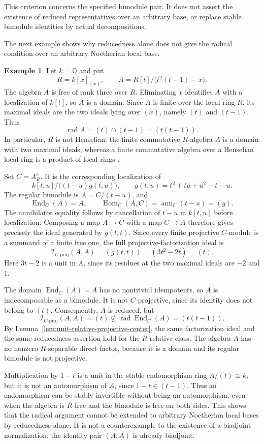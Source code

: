 \documentclass[12pt,a4paper,english,reqno]{amsart}
\numberwithin{equation}{section}
\theoremstyle{plain}
\theoremstyle{definition}
\newtheorem{example}[theorem]{Example}
\begin{document}
This criterion concerns the specified bimodule pair.  It does not
assert the existence of reduced representatives over an arbitrary
base, or replace stable bimodule identities by actual decompositions.

The next example shows why reducedness alone does not give the
radical condition over an arbitrary Noetherian local base.

\begin{example}
\label{ex:nonhenselian-stable-unit}
Let $k=\mathbb Q$ and put
\[
 R=k[x]_{(x)},\qquad
 A=R[t]/\bigl(t^2(t-1)-x\bigr).
\]
The algebra $A$ is free of rank three over $R$.  Eliminating $x$
identifies $A$ with a localization of $k[t]$, so $A$ is a domain.
Since $A$ is finite over the local ring $R$, its maximal ideals are
the two ideals lying over $(x)$, namely $(t)$ and $(t-1)$.  Thus
\[
 \operatorname{rad}A=(t)\cap(t-1)=(t(t-1)).
\]
In particular, $R$ is not Henselian: the finite commutative
$R$-algebra $A$ is a domain with two maximal ideals, whereas a
finite commutative algebra over a Henselian local ring is a product
of local rings \cite[Lemma~10.153.3]{StacksHenselian2026}.

Set $C=A^e_R$.  It is the corresponding localization of
\[
 k[t,u]/\bigl((t-u)g(t,u)\bigr),
 \qquad g(t,u)=t^2+tu+u^2-t-u.
\]
The regular bimodule is $A=C/(t-u)$, and
\[
 \operatorname{End}_C(A)=A,\qquad
 \operatorname{Hom}_C(A,C)=\operatorname{ann}_C(t-u)=(g).
\]
The annihilator equality follows by cancellation of $t-u$ in
$k[t,u]$ before localization.  Composing a map $A\to C$ with a map
$C\to A$ therefore gives precisely the ideal generated by
$g(t,t)$.  Since every finite projective $C$-module is a summand of
a finite free one, the full projective-factorization ideal is
\[
 \mathcal I_{C\text{-}\mathrm{proj}}(A,A)
 =(g(t,t))=(3t^2-2t)=(t).
\]
Here $3t-2$ is a unit in $A$, since its residues at the two maximal
ideals are $-2$ and $1$.

The domain $\operatorname{End}_C(A)=A$ has no nontrivial
idempotents, so $A$ is indecomposable as a bimodule.  It is not
$C$-projective, since its identity does not belong to $(t)$.
Consequently, $A$ is reduced, but
\[
 \mathcal I_{C\text{-}\mathrm{proj}}(A,A)=(t)
 \not\subseteq\operatorname{rad}\operatorname{End}_C(A)
 =(t(t-1)).
\]
By Lemma~\ref{lem:unit-relative-projective-center}, the same
factorization ideal and the same reducedness assertion hold for
the $R$-relative class.  The algebra $A$ has no nonzero
$R$-separable direct factor, because it is a domain and its regular
bimodule is not projective.

Multiplication by $1-t$ is a unit in the stable endomorphism ring
$A/(t)\cong k$, but it is not an automorphism of $A$, since
$1-t\in(t-1)$.  Thus an endomorphism can be stably invertible
without being an automorphism, even when the algebra is $R$-free
and the bimodule is free on both sides.
This shows that the radical argument cannot be extended to
arbitrary Noetherian local bases by reducedness alone.  It is not
a counterexample to the existence of a biadjoint normalization:
the identity pair $(A,A)$ is already biadjoint.
\end{example}
\end{document}
